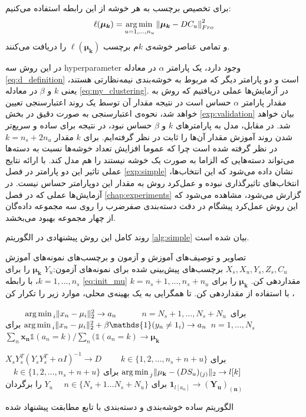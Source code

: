 برای تخصیص برچسب به هر خوشه از این رابطه استفاده می‌کنیم:
\begin{equation}
\label{eq:simple_assignment}
\ell(\boldsymbol{\mu_k}) = \operatorname*{arg\,min\,}_{u=1,\ldots,n_u} \left \lVert \boldsymbol{\mu_k} - DC_{u} \right \rVert_{Fro}^2
\end{equation}
و تمامی عناصر خوشه‌ی $k$م برچسب $\ell(\boldsymbol{\mu_k})$ را دریافت می‌کنند.

در این روش سه \gls{hyperparameter} وجود دارد، یک پارامتر $\alpha$ در معادله
\eqref{eq:d_definition}
است و دو پارامتر دیگر که مربوط به خوشه‌بندی نیمه‌نظارتی هستند، یعنی $k$ و $\beta$ در معادله
\eqref{eq:my_clustering}.
در آزمایش‌ها عملی دریافتیم که روش به مقدار پارامتر $\alpha$ حساس است در نتیجه مقدار آن توسط یک روند اعتبارسنجی تعیین خواهد شد، نحوه‌ی اعتبارسنجی به صورت دقیق در بخش
\ref{exp:validation}
بیان خواهد شد. در مقابل، مدل به پارامترهای $k$ و $\beta$ حساس نبود، در نتیجه برای ساده و سریع‌تر شدن روند آموزش مقدار آن‌ها را ثابت در نظر گرفته‌ایم. برای $k$ مقدار
$k = n_s + 2n_u$
در نظر گرفته شده است چرا که عموما افزایش تعداد خوشه‌ها نسبت به دسته‌ها می‌تواند دسته‌هایی که الزاما به صورت یک خوشه نیستند را هم مدل کند.
 با ارائه نتایج عملی تاثیر این دو پارامتر در فصل
 \ref{exp:simple}
 نشان داده می‌شود که این انتخاب‌ها، انتخاب‌های تاثیرگذاری نبوده و عمل‌کرد روش به مقدار این دوپارامتر حساس نیست.
در آزمایش‌ها عملی که در فصل
\ref{chap:experiments}
گزارش می‌شود، مشاهده می‌شود که این روش  عمل‌کرد پیشگام در دقت دسته‌بندی صفرضرب را روی سه مجموعه داده‌گان از چهار مجموعه بهبود می‌بخشد.



روند کامل این روش پیشنهادی در الگوریتم
\ref{alg:simple}
بیان شده است.

	\begin{enumerate}[label={\arabic*},itemsep=.1em, parsep=.1em]
 تصاویر و توصیف‌های آموزش و آزمون و برچسب‌های نمونه‌های آموزش $X_s, X_u, Y_s, Z_s, C_u$
 برچسب‌های پیش‌بینی شده برای نمونه‌های آزمون:$Y_u$
  $\boldsymbol{\mu_k}$ را برای  $k=1,\ldots,n_s$،  با رابطه \eqref{eq:init_mu} مقداردهی کن.
  $\boldsymbol{\mu_k}$ را برای $k=n_s+1,\ldots,n_s+n_u$، با استفاده از  مقداردهی کن.
 تا همگرایی به یک بهینه‌ی محلی، موارد زیر را تکرار کن

$\qquad$
${\operatorname*{arg\,min\,}_i \lVert x_n - \mu_i \rVert_2^2} \rightarrow a_n \, $
برای
$\, n = N_s + 1, \ldots, N_s+N_u \,$
 $\qquad$
${\argmin_i \lVert x_n - \mu_i \rVert_2^2} + \beta \mathds{1}(y_n \neq 1_i) \rightarrow a_n \, $
برای
 $n = 1, \ldots, N_s \quad$
 $\qquad$ $\sum_{n} \mathbf{x_n} \mathds{1}(a_n = k) / \sum_n (\mathds{1}(a_n = k) \rightarrow \mathbf{\mu_k}$

 $X_s Y_s^T (Y_s Y_s^T + \alpha I)^{-1} \rightarrow D\quad$
 برای 
 $\quad k \in \{1,2,\ldots, n_s + n+u\}$
 $\operatorname*{arg\,min\,}_j \lVert \mathbf{\mu_k} - (DS_u)_{(j)} \rVert_2 \rightarrow l[k] \quad$
 برای 
 $\quad k \in \{1,2,\ldots, n_s + n+u\}$
   $ \mathbf{1}_{l[a_n]} \rightarrow \mathbf{(Y_u)_{(n)}}  \quad$
   برای 
   $\quad n \in \{ N_s +1 \ldots N_s + N_u \}$
 $Y_u$ را برگردان
\end{enumerate}
\caption{الگوریتم ساده خوشه‌بندی و دسته‌بندی با تابع مطابقت پیشنهاد شده}
\label{alg:simple}


